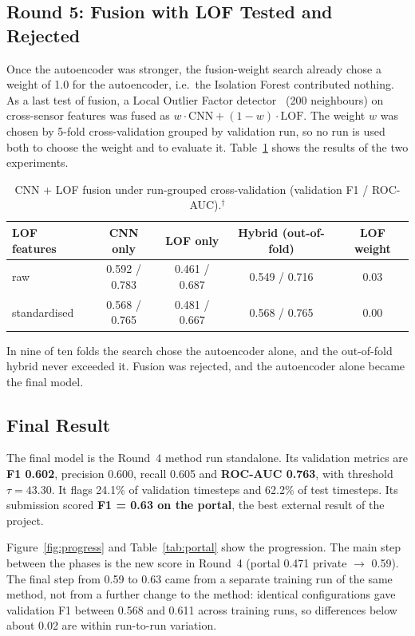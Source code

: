 \documentclass[runningheads]{llncs}
\newcommand{\doc}{$^\dagger$}
\begin{document}
\subsection{Round 5: Fusion with LOF Tested and Rejected}

Once the autoencoder was stronger, the fusion-weight search already chose a weight of 1.0 for the autoencoder, i.e.\ the Isolation Forest contributed nothing. As a last test of fusion, a Local Outlier Factor detector~\cite{breunig2000lof} (200 neighbours) on cross-sensor features was fused as $w \cdot \text{CNN} + (1-w) \cdot \text{LOF}$. The weight $w$ was chosen by 5-fold cross-validation grouped by validation run, so no run is used both to choose the weight and to evaluate it. Table~\ref{tab:lof} shows the results of the two experiments.

\begin{table}[ht]
\centering
\caption{CNN + LOF fusion under run-grouped cross-validation (validation F1 / ROC-AUC).\doc}\label{tab:lof}
\begin{tabular}{lcccc}
\toprule
LOF features & CNN only & LOF only & Hybrid (out-of-fold) & LOF weight \\
\midrule
raw & 0.592 / 0.783 & 0.461 / 0.687 & 0.549 / 0.716 & 0.03 \\
standardised & 0.568 / 0.765 & 0.481 / 0.667 & 0.568 / 0.765 & 0.00 \\
\bottomrule
\end{tabular}
\end{table}

In nine of ten folds the search chose the autoencoder alone, and the out-of-fold hybrid never exceeded it. Fusion was rejected, and the autoencoder alone became the final model.

\subsection{Final Result}

The final model is the Round~4 method run standalone. Its validation metrics are \textbf{F1 0.602}, precision 0.600, recall 0.605 and \textbf{ROC-AUC 0.763}, with threshold $\tau = 43.30$. It flags 24.1\% of validation timesteps and 62.2\% of test timesteps. Its submission scored \textbf{F1 = 0.63 on the portal}, the best external result of the project.

Figure~\ref{fig:progress} and Table~\ref{tab:portal} show the progression. The main step between the phases is the new score in Round~4 (portal 0.471 private $\rightarrow$ 0.59). The final step from 0.59 to 0.63 came from a separate training run of the same method, not from a further change to the method: identical configurations gave validation F1 between 0.568 and 0.611 across training runs, so differences below about 0.02 are within run-to-run variation.
\end{document}
